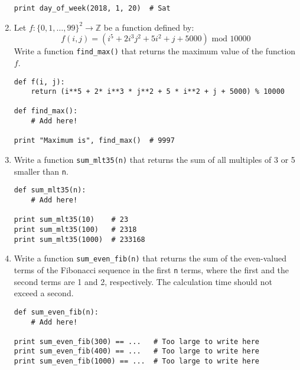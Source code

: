 \documentclass[../main.tex]{subfiles}
\begin{document}
\begin{enumerate}
\begin{verbatim}
print day_of_week(2018, 1, 20)  # Sat
\end{verbatim}

\item Let $f: \{0, 1, \dots, 99\}^2 \rightarrow \mathbb{Z}$ be a function defined by:
$$
f(i, j) = \left(i^5 + 2i^3j^2 + 5i^2 + j + 5000\right) \text{ mod $10000$}
$$
Write a function \texttt{find\_max()} that returns the maximum value of the function $f$.
\begin{verbatim}
def f(i, j):
	return (i**5 + 2* i**3 * j**2 + 5 * i**2 + j + 5000) % 10000
	
def find_max():
	# Add here!

print "Maximum is", find_max()  # 9997
\end{verbatim}

\item Write a function \texttt{sum\_mlt35(n)} that returns the sum of all multiples of 3 or 5 smaller than \texttt{n}.
\begin{verbatim}
def sum_mlt35(n):
	# Add here!

print sum_mlt35(10)    # 23
print sum_mlt35(100)   # 2318
print sum_mlt35(1000)  # 233168
\end{verbatim}

\item Write a function \texttt{sum\_even\_fib(n)} that returns the sum of the even-valued terms of the Fibonacci sequence in the first \texttt{n} terms, where the first and the second terms are 1 and 2, respectively.
The calculation time should not exceed a second.

\begin{verbatim}
def sum_even_fib(n):
	# Add here!
	
print sum_even_fib(300) == ...   # Too large to write here
print sum_even_fib(400) == ...   # Too large to write here
print sum_even_fib(1000) == ...  # Too large to write here
\end{verbatim}


\end{enumerate}
\end{document}
